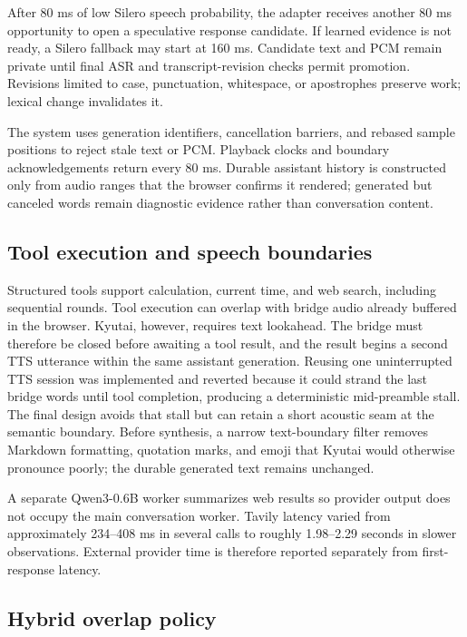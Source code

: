 \documentclass[10pt,twocolumn]{article}
\begin{document}
After 80 ms of low Silero speech probability, the adapter receives another 80 ms opportunity to
open a speculative response candidate. If learned evidence is not ready, a Silero fallback may
start at 160 ms. Candidate text and PCM remain private until final ASR and transcript-revision checks
permit promotion. Revisions limited to case, punctuation, whitespace, or apostrophes preserve work;
lexical change invalidates it.

The system uses generation identifiers, cancellation barriers, and rebased sample positions to
reject stale text or PCM. Playback clocks and boundary acknowledgements return every 80 ms. Durable
assistant history is constructed only from audio ranges that the browser confirms it rendered;
generated but canceled words remain diagnostic evidence rather than conversation content.

\subsection{Tool execution and speech boundaries}

Structured tools support calculation, current time, and web search, including sequential rounds.
Tool execution can overlap with bridge audio already buffered in the browser. Kyutai, however,
requires text lookahead. The bridge must therefore be closed before awaiting a tool result, and the
result begins a second TTS utterance within the same assistant generation. Reusing one uninterrupted
TTS session was implemented and reverted because it could strand the last bridge words until tool
completion, producing a deterministic mid-preamble stall. The final design avoids that stall but
can retain a short acoustic seam at the semantic boundary.
Before synthesis, a narrow text-boundary filter removes Markdown formatting, quotation marks, and
emoji that Kyutai would otherwise pronounce poorly; the durable generated text remains unchanged.

A separate Qwen3-0.6B worker \cite{qwen06} summarizes web results so provider output does not occupy the main
conversation worker. Tavily latency varied from approximately 234--408 ms in several calls to
roughly 1.98--2.29 seconds in slower observations. External provider time is therefore reported
separately from first-response latency.

\subsection{Hybrid overlap policy}
\end{document}
